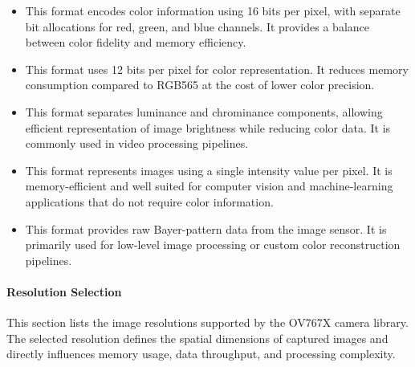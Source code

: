 \begin{itemize}
	\item {} 
	
	This format encodes color information using 16 bits per pixel, with separate bit allocations for red, green, and blue channels. It provides a balance between color fidelity and memory efficiency.
	
	\item {} 
	
	This format uses 12 bits per pixel for color representation. It reduces memory consumption compared to RGB565 at the cost of lower color precision.
	
	\item {} 
	
	This format separates luminance and chrominance components, allowing efficient representation of image brightness while reducing color data. It is commonly used in video processing pipelines.
	
	\item {} 
	
	This format represents images using a single intensity value per pixel. It is memory-efficient and well suited for computer vision and machine-learning applications that do not require color information.
	
	\item {} 
	
	This format provides raw Bayer-pattern data from the image sensor. It is primarily used for low-level image processing or custom color reconstruction pipelines.
\end{itemize}


\paragraph{Resolution Selection}
This section lists the image resolutions supported by the OV767X camera library. The selected resolution defines the spatial dimensions of captured images and directly influences memory usage, data throughput, and processing complexity.

